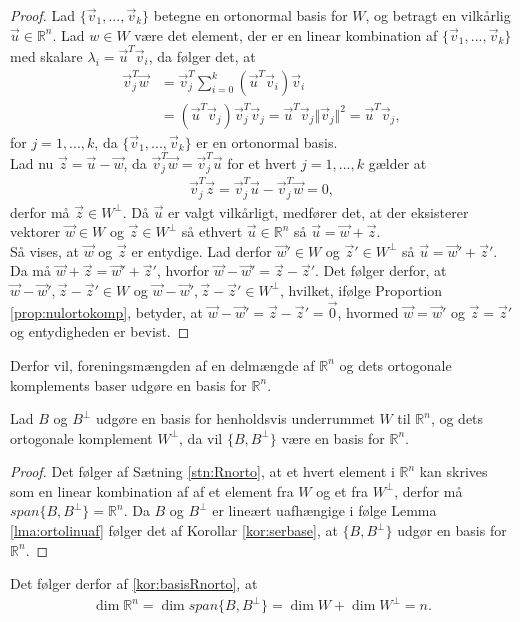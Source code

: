 \begin{proof}
Lad $\{\vec{v}_1,...,\vec{v}_k\}$ betegne en ortonormal basis for $W$, og betragt en vilkårlig $\vec{u} \in \mathds{R}^n$. 
Lad $w \in W$ være det element, der er en linear kombination af $\{\vec{v}_1,...,\vec{v}_k\}$ med skalare $\lambda_i = \vec{u}^T\vec{v}_i$, da følger det, at
\begin{align*}
\vec{v}_j^T\vec{w} &= \vec{v}_j^T\sum_{i=0}^k(\vec{u}^T\vec{v}_i)\vec{v}_i
\\ & = (\vec{u}^T\vec{v}_j)\vec{v}_j^T\vec{v}_j = \vec{u}^T\vec{v}_j \Vert \vec{v}_j \Vert^2 = \vec{u}^T\vec{v}_j,
\end{align*}
for $j=1,...,k$, da $\{\vec{v}_1,...,\vec{v}_k\}$ er en ortonormal basis.
\\ Lad nu $\vec{z} = \vec{u}- \vec{w}$, da $\vec{v}_j^T\vec{w}= \vec{v}_j^T\vec{u}$ for et hvert $j=1,...,k$ gælder at 
\begin{align*}
\vec{v}_j^T\vec{z} = \vec{v}_j^T\vec{u}- \vec{v}_j^T\vec{w} = 0,
\end{align*}
derfor må $\vec{z} \in W^{\bot}$. 
Då $\vec{u}$ er valgt vilkårligt, medfører det, at der eksisterer vektorer $\vec{w} \in W$ og $\vec{z} \in W^{\bot}$ så ethvert $\vec{u} \in \mathds{R}^n$ så $\vec{u}= \vec{w}+\vec{z}$.
\\Så vises, at $\vec{w}$ og $\vec{z}$ er entydige.
Lad derfor $\vec{w}' \in W$ og $\vec{z}' \in W^{\bot}$ så $\vec{u}= \vec{w}' + \vec{z}'$.
Da må $\vec{w} + \vec{z} = \vec{w}' + \vec{z}'$, hvorfor $\vec{w}-\vec{w}' = \vec{z}-\vec{z}'$.
Det følger derfor, at $\vec{w}-\vec{w}', \vec{z}-\vec{z}' \in W$ og $\vec{w}-\vec{w}', \vec{z}-\vec{z}' \in W^{\bot}$, hvilket, ifølge Proportion \ref{prop:nulortokomp}, betyder, at $\vec{w}-\vec{w}' = \vec{z}-\vec{z}' = \vec{0}$, hvormed $\vec{w}= \vec{w}'$ og $\vec{z}=\vec{z}'$ og entydigheden er bevist.
\end{proof}
Derfor vil, foreningsmængden af en delmængde af $\mathds{R}^n$ og dets ortogonale komplements baser udgøre en basis for $\mathds{R}^n$.
\begin{kor}
Lad $B$  og $B^{\bot}$ udgøre en basis for henholdsvis underrummet $W$ til $\mathds{R}^n$, og dets ortogonale komplement $W^{\bot}$, da vil $\{B, B^{\bot}\}$ være en basis for $\mathds{R}^n$.
\label{kor:basisRnorto}
\end{kor}
\begin{proof}
Det følger af Sætning \ref{stn:Rnorto}, at et hvert element i $\mathds{R}^n$ kan skrives som en linear kombination af af et element fra $W$ og et fra $W^{\bot}$, derfor må $span\{B, B^{\bot}\} = \mathds{R}^n$. 
Da $B$ og $B^{\bot}$ er lineært uafhængige i følge Lemma \ref{lma:ortolinuaf} følger det af Korollar \ref{kor:serbase}, at $\{B, B^{\bot}\}$ udgør en basis for $\mathds{R}^n$.
\end{proof}
\begin{bem}
Det følger derfor af \ref{kor:basisRnorto}, at
\begin{align}
\dim{\mathds{R}^n} = \dim{span\{B, B^{\bot}\}} = \dim{W} + \dim{W^{\bot}} = n.
\end{align}
\end{bem}
 

 